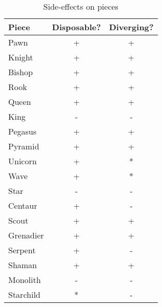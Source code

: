 \begin{table}[!h]
\centering
\begin{tabular}{ lcc }
\toprule %
\textbf{Piece} & \textbf{Disposable?} & \textbf{Diverging?}   \\
\midrule %
Pawn           & +                    & +                     \\
Knight         & +                    & +                     \\
Bishop         & +                    & +                     \\
Rook           & +                    & +                     \\
Queen          & +                    & +                     \\
King           & -                    & -                     \\
\cmidrule{1-3} %
Pegasus        & +                    & +                     \\
Pyramid        & +                    & +                     \\
Unicorn        & +                    & *\footnotemark[2]     \\
Wave           & +                    & *\footnotemark[3]     \\
Star           & -                    & -                     \\
Centaur        & +                    & -                     \\
Scout          & +                    & +                     \\
Grenadier      & +                    & +                     \\
Serpent        & +                    & -                     \\
Shaman         & +                    & +                     \\
Monolith       & -                    & -                     \\
Starchild      & *\footnotemark[1]    & -                     \\
\bottomrule %
\end{tabular}
\caption{Side-effects on pieces}
\label{tbl:Appendix/Summary/Side-effects/Side-effects on pieces}
\end{table}

